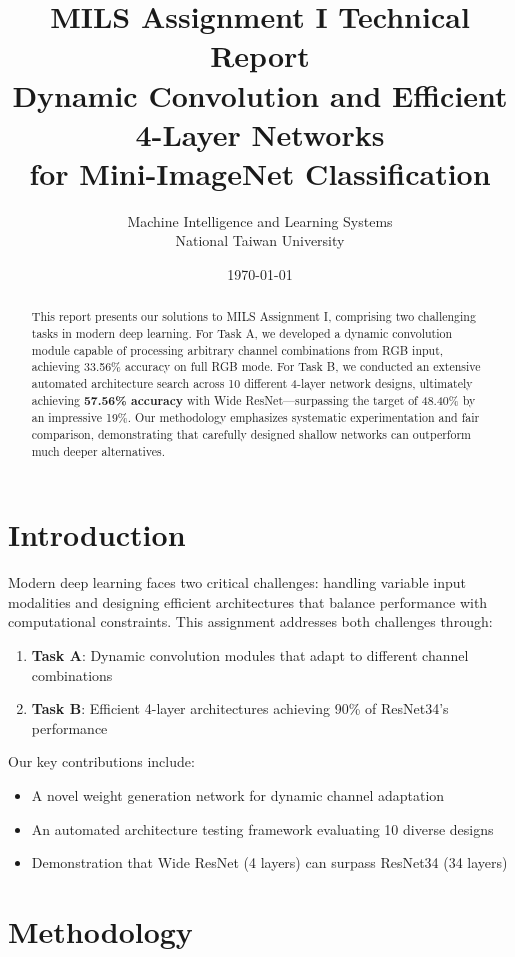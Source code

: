 \documentclass[11pt,a4paper]{article}
\title{\textbf{MILS Assignment I Technical Report}\\
\Large Dynamic Convolution and Efficient 4-Layer Networks\\
for Mini-ImageNet Classification}
\author{Machine Intelligence and Learning Systems\\
National Taiwan University}
\date{\today}
\begin{document}
\maketitle

\begin{abstract}
This report presents our solutions to MILS Assignment I, comprising two challenging tasks in modern deep learning. For Task A, we developed a dynamic convolution module capable of processing arbitrary channel combinations from RGB input, achieving 33.56\% accuracy on full RGB mode. For Task B, we conducted an extensive automated architecture search across 10 different 4-layer network designs, ultimately achieving \textbf{57.56\% accuracy} with Wide ResNet—surpassing the target of 48.40\% by an impressive 19\%. Our methodology emphasizes systematic experimentation and fair comparison, demonstrating that carefully designed shallow networks can outperform much deeper alternatives.
\end{abstract}

\section{Introduction}

Modern deep learning faces two critical challenges: handling variable input modalities and designing efficient architectures that balance performance with computational constraints. This assignment addresses both challenges through:

\begin{enumerate}
    \item \textbf{Task A}: Dynamic convolution modules that adapt to different channel combinations
    \item \textbf{Task B}: Efficient 4-layer architectures achieving 90\% of ResNet34's performance
\end{enumerate}

Our key contributions include:
\begin{itemize}
    \item A novel weight generation network for dynamic channel adaptation
    \item An automated architecture testing framework evaluating 10 diverse designs
    \item Demonstration that Wide ResNet (4 layers) can surpass ResNet34 (34 layers)
\end{itemize}

\section{Methodology}
\end{document}
